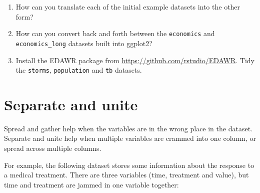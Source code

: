 \begin{enumerate}
\def\labelenumi{\arabic{enumi}.}
\item
  How can you translate each of the initial example datasets into the
  other form?
\item
  How can you convert back and forth between the \texttt{economics} and
  \texttt{economics\_long} datasets built into ggplot2?
\item
  Install the EDAWR package from \url{https://github.com/rstudio/EDAWR}.
  Tidy the \texttt{storms}, \texttt{population} and \texttt{tb}
  datasets.
\end{enumerate}

\hypertarget{sec:separate-unite}{%
\section{Separate and unite}\label{sec:separate-unite}}

Spread and gather help when the variables are in the wrong place in the
dataset. Separate and unite help when multiple variables are crammed
into one column, or spread across multiple columns. 

For example, the following dataset stores some information about the
response to a medical treatment. There are three variables (time,
treatment and value), but time and treatment are jammed in one variable
together:

\begin{Shaded}
\begin{Highlighting}[]
\StringTok{ }\OperatorTok{::}\NormalTok{(}
   \NormalTok{(}\NormalTok{(}\NormalTok{(}\NormalTok{, }\NormalTok{), } \NormalTok{), }\NormalTok{, }\NormalTok{(}\NormalTok{(}\NormalTok{, }\NormalTok{, }\NormalTok{))),}
   \NormalTok{(}\NormalTok{, }\NormalTok{, }\NormalTok{, }\NormalTok{, }\NormalTok{, }\NormalTok{)}
\NormalTok{)}
\end{Highlighting}
\end{Shaded}

